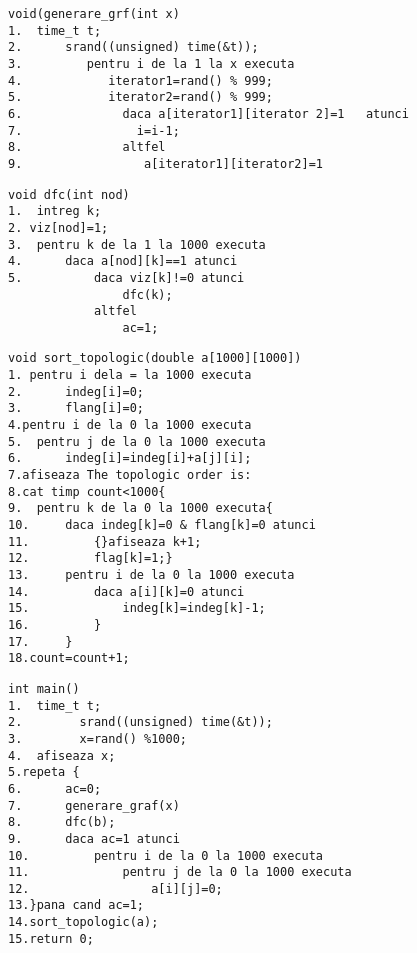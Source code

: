 \documentclass[14pt]{article}
\begin{document}
\begin{lstlisting}
void(generare_grf(int x)
1.	time_t t;
2.      srand((unsigned) time(&t));
3.         pentru i de la 1 la x executa
4.            iterator1=rand() % 999;
5.            iterator2=rand() % 999;
6.              daca a[iterator1][iterator 2]=1   atunci
7.                i=i-1;
8.              altfel 
9.                 a[iterator1][iterator2]=1
\end{lstlisting}
\begin{lstlisting}
void dfc(int nod)
1. 	intreg k;
2. viz[nod]=1;
3.  pentru k de la 1 la 1000 executa
4.      daca a[nod][k]==1 atunci
5.          daca viz[k]!=0 atunci
                dfc(k);
            altfel
                ac=1;
\end{lstlisting}
\begin{lstlisting}
void sort_topologic(double a[1000][1000])
1. pentru i dela = la 1000 executa
2.      indeg[i]=0;
3.      flang[i]=0;
4.pentru i de la 0 la 1000 executa
5.  pentru j de la 0 la 1000 executa
6.      indeg[i]=indeg[i]+a[j][i];
7.afiseaza The topologic order is:
8.cat timp count<1000{
9.  pentru k de la 0 la 1000 executa{
10.     daca indeg[k]=0 & flang[k]=0 atunci
11.         {}afiseaza k+1;
12.         flag[k]=1;}
13.     pentru i de la 0 la 1000 executa
14.         daca a[i][k]=0 atunci
15.             indeg[k]=indeg[k]-1;
16.         }
17.     }
18.count=count+1;
\end{lstlisting}
\begin{lstlisting}
int main()
1.  time_t t;
2.        srand((unsigned) time(&t));
3.        x=rand() %1000;
4.  afiseaza x;
5.repeta {
6.      ac=0;
7.      generare_graf(x)
8.      dfc(b);
9.      daca ac=1 atunci
10.         pentru i de la 0 la 1000 executa
11.             pentru j de la 0 la 1000 executa
12.                 a[i][j]=0;
13.}pana cand ac=1;
14.sort_topologic(a);
15.return 0;
\end{lstlisting}



\newpage
\end{document}
